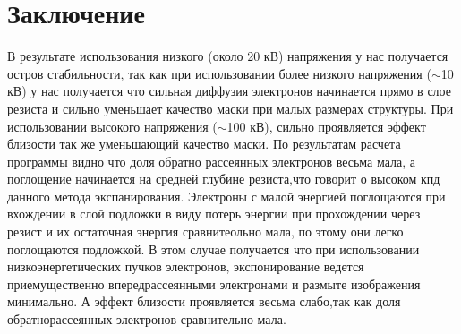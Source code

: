 \chapter*{Заключение}
В результате использования низкого (около 20 кВ) напряжения у нас получается остров стабильности,
так как при использовании более низкого напряжения (\(\sim\)10 кВ) у нас получается что сильная диффузия электронов начинается прямо в слое резиста и сильно уменьшает качество маски при малых размерах структуры.
При использовании высокого напряжения (\(\sim\)100 кВ), сильно проявляется эффект близости так же уменьшающий качество маски.
По результатам расчета программы видно что доля обратно рассеянных электронов весьма мала, а поглощение начинается на средней глубине резиста,что говорит о высоком кпд данного метода экспанирования. Электроны с малой энергией поглощаются при вхождении в слой подложки в виду потерь энергии при прохождении через резист и их остаточная энергия сравнитеольно мала, по этому они легко поглощаются подложкой. В этом случае получается что при использовании низкоэнергетических пучков электронов, экспонирование ведется приемущественно впередрассеянными электронами и размыте изображения минимально. А эффект близости проявляется весьма слабо,так как доля обратнорассеянных электронов 
сравнительно мала.


